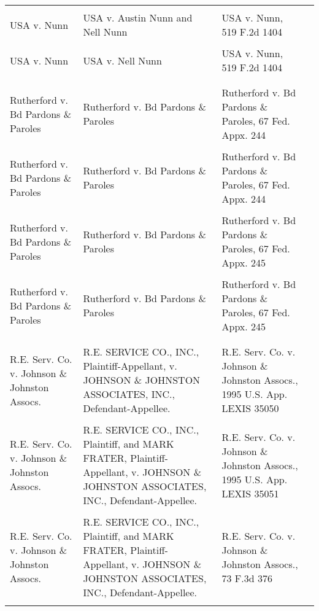 \documentclass[10pt, letterpaper]{article}
\begin{document}
\begin{spacing}{1.0}
\begin{footnotesize}
\begin{longtable}[H]{>{\raggedright}p{2in}>{\raggedright}p{2in}>{\raggedright}p{2in}p{0in}}
        & & &\\[-4pt]
        USA v. Nunn & USA v. Austin Nunn and Nell Nunn & USA v. Nunn, 519 F.2d 1404 &\\
        & & &\\[-4pt]
        USA v. Nunn & USA v. Nell Nunn & USA v. Nunn, 519 F.2d 1404 &\\
        & & &\\[-4pt]
        \hline\\[-4pt]
        Rutherford v. Bd Pardons \& Paroles & Rutherford v. Bd Pardons \& Paroles & Rutherford v. Bd Pardons \& Paroles, 67 Fed. Appx. 244 &\\
        & & &\\[-4pt]
        Rutherford v. Bd Pardons \& Paroles & Rutherford v. Bd Pardons \& Paroles & Rutherford v. Bd Pardons \& Paroles, 67 Fed. Appx. 244 &\\
        & & &\\[-4pt]
        Rutherford v. Bd Pardons \& Paroles & Rutherford v. Bd Pardons \& Paroles & Rutherford v. Bd Pardons \& Paroles, 67 Fed. Appx. 245 &\\
        & & &\\[-4pt]
        Rutherford v. Bd Pardons \& Paroles & Rutherford v. Bd Pardons \& Paroles & Rutherford v. Bd Pardons \& Paroles, 67 Fed. Appx. 245 &\\
        & & &\\[-4pt]
        \hline\\[-4pt]
        R.E. Serv. Co. v. Johnson \& Johnston Assocs. & R.E. SERVICE CO., INC., Plaintiff-Appellant, v. JOHNSON \& JOHNSTON ASSOCIATES, INC., Defendant-Appellee. & R.E. Serv. Co. v. Johnson \& Johnston Assocs., 1995 U.S. App. LEXIS 35050 &\\
        & & &\\[-4pt]
        R.E. Serv. Co. v. Johnson \& Johnston Assocs. & R.E. SERVICE CO., INC., Plaintiff, and MARK FRATER, Plaintiff-Appellant, v. JOHNSON \& JOHNSTON ASSOCIATES, INC., Defendant-Appellee. & R.E. Serv. Co. v. Johnson \& Johnston Assocs., 1995 U.S. App. LEXIS 35051 &\\
        & & &\\[-4pt]
        R.E. Serv. Co. v. Johnson \& Johnston Assocs. & R.E. SERVICE CO., INC., Plaintiff, and MARK FRATER, Plaintiff-Appellant, v. JOHNSON \& JOHNSTON ASSOCIATES, INC., Defendant-Appellee. & R.E. Serv. Co. v. Johnson \& Johnston Assocs., 73 F.3d 376 &\\
        & & &\\[-4pt]

\end{longtable}
\end{footnotesize}
\end{spacing}
\end{document}
